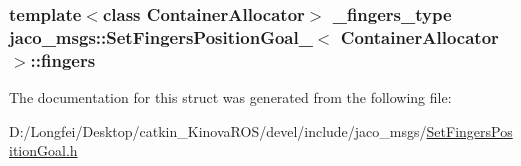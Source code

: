\subsubsection[{\texorpdfstring{fingers}{fingers}}]{\setlength{\rightskip}{0pt plus 5cm}template$<$class Container\+Allocator$>$ {\bf \+\_\+fingers\+\_\+type} {\bf jaco\+\_\+msgs\+::\+Set\+Fingers\+Position\+Goal\+\_\+}$<$ Container\+Allocator $>$\+::fingers}\hypertarget{structjaco__msgs_1_1SetFingersPositionGoal___a4dc54e46b1b6111db63125188a0d939e}{}\label{structjaco__msgs_1_1SetFingersPositionGoal___a4dc54e46b1b6111db63125188a0d939e}


The documentation for this struct was generated from the following file\+:\begin{DoxyCompactItemize}
\item 
D\+:/\+Longfei/\+Desktop/catkin\+\_\+\+Kinova\+R\+O\+S/devel/include/jaco\+\_\+msgs/\hyperlink{SetFingersPositionGoal_8h}{Set\+Fingers\+Position\+Goal.\+h}\end{DoxyCompactItemize}
